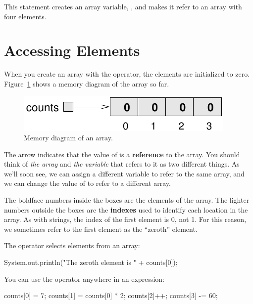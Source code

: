 This statement creates an array variable, , and makes it refer to an array with four elements.


\section{Accessing Elements}
\label{elements}

When you create an array with the  operator, the elements are initialized to zero.
Figure~\ref{fig.array} shows a memory diagram of the  array so far.

\begin{figure}[!ht]
\begin{center}
\includegraphics{figs/array.pdf}
\caption{Memory diagram of an  array.}
\label{fig.array}
\end{center}
\end{figure}


The arrow indicates that the value of  is a {\bf reference} to the array.
You should think of {\em the array} and {\em the variable} that refers to it as two different things.
As we'll soon see, we can assign a different variable to refer to the same array, and we can change the value of  to refer to a different array.


The boldface numbers inside the boxes are the elements of the array.
The lighter numbers outside the boxes are the {\bf indexes} used to identify each location in the array.
As with strings, the index of the first element is 0, not 1.
For this reason, we sometimes refer to the first element as the ``zeroth'' element.

The \java{[]} operator selects elements from an array:

\begin{code}
System.out.println("The zeroth element is " + counts[0]);
\end{code}

You can use the \java{[]} operator anywhere in an expression:

\begin{code}
counts[0] = 7;
counts[1] = counts[0] * 2;
counts[2]++;
counts[3] -= 60;
\end{code}

